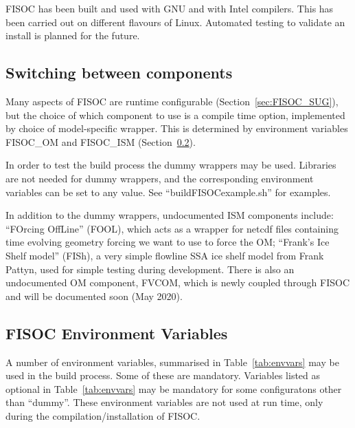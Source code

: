 \documentclass[11pt]{article}
\begin{document}

FISOC has been built and used with GNU and with Intel compilers. 
This has been carried out on different flavours of Linux.
Automated testing to validate an install is planned for the future. 



\subsection{Switching between components}

Many aspects of FISOC are runtime configurable (Section~\ref{sec:FISOC_SUG}), 
but the choice of which component to use is a compile time option, implemented 
by choice of model-specific wrapper. 
This is determined by environment variables FISOC\_OM and FISOC\_ISM 
(Section~\ref{sec:EnvVars}). 

In order to test the build process the dummy wrappers may be used. 
Libraries are not needed for dummy wrappers, and the corresponding 
environment variables can be set to any value.
See  ``buildFISOCexample.sh'' for examples. 

In addition to the dummy wrappers, undocumented ISM components 
 include: 
``FOrcing OffLine'' (FOOL), which acts as a wrapper for netcdf files 
containing time evolving geometry forcing we want to use to force the 
OM; 
``Frank's Ice Shelf model'' (FISh), a very simple flowline SSA 
ice shelf model from Frank Pattyn, used for simple testing during 
development.
There is also an undocumented OM component, FVCOM, which is newly coupled through
FISOC and will be documented soon (May 2020). 



\subsection{FISOC Environment Variables}
\label{sec:EnvVars}

A number of  environment variables, summarised in Table~\ref{tab:envvars}
may be used in the build process.
Some of these are mandatory. 
Variables listed as optional in Table~\ref{tab:envvars}
may be mandatory for some configuratons 
other than ``dummy''.
These environment variables are not used at run time, only during 
the compilation/installation of FISOC.
\end{document}
